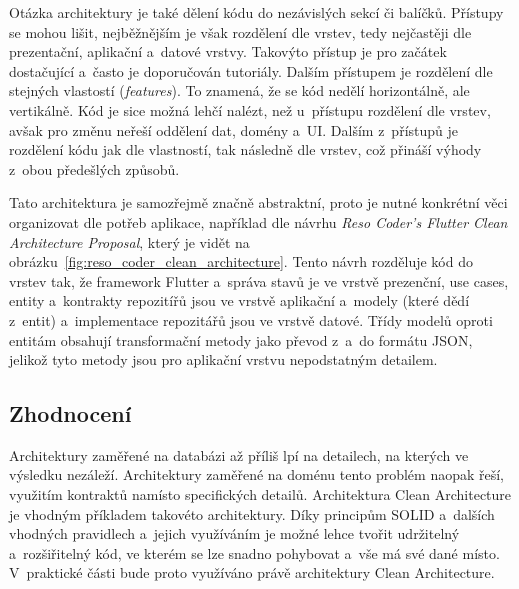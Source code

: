 Otázka architektury je také dělení kódu do nezávislých sekcí či balíčků.
Přístupy se mohou lišit,
nejběžnějším je však rozdělení dle vrstev,
tedy nejčastěji dle prezentační, aplikační a~datové vrstvy.
Takovýto přístup je pro začátek dostačující a~často je doporučován tutoriály.
Dalším přístupem je rozdělení dle stejných vlastostí (\emph{features}).
To znamená,
že se kód nedělí horizontálně,
ale vertikálně.
Kód je sice možná lehčí nalézt,
než u~přístupu rozdělení dle vrstev,
avšak pro změnu neřeší oddělení dat, domény a~UI.
Dalším z~přístupů je rozdělení kódu jak dle vlastností,
tak následně dle vrstev,
což přináší výhody z~obou předešlých
způsobů.~\cite[kapitola~34]{the_clean_architecture}

Tato architektura je samozřejmě značně abstraktní,
proto je nutné konkrétní věci organizovat dle potřeb aplikace,
například dle návrhu \emph{Reso Coder's Flutter Clean Architecture Proposal},
který je vidět na obrázku~\ref{fig:reso_coder_clean_architecture}.
Tento návrh rozděluje kód do vrstev tak,
že framework Flutter a~správa stavů je ve vrstvě prezenční,
use cases, entity a~kontrakty repozitířů jsou ve vrstvě aplikační
a~modely (které dědí z~entit) a~implementace repozitářů jsou ve vrstvě datové.
Třídy modelů oproti entitám obsahují transformační metody jako
převod z~a~do formátu JSON,
jelikož tyto metody jsou pro aplikační vrstvu nepodstatným
detailem.~\cite{reso_coder_clean_architecture}

\subsection{Zhodnocení}

Architektury zaměřené na databázi až příliš lpí na detailech,
na kterých ve výsledku nezáleží.
Architektury zaměřené na doménu tento problém naopak řeší,
využitím kontraktů namísto specifických detailů.
Architektura Clean Architecture je vhodným příkladem takovéto architektury.
Díky principům SOLID a~dalších vhodných pravidlech a~jejich využíváním
je možné lehce tvořit udržitelný a~rozšiřitelný kód,
ve kterém se lze snadno pohybovat a~vše má své dané místo.
V~praktické části bude proto využíváno právě architektury Clean Architecture.
